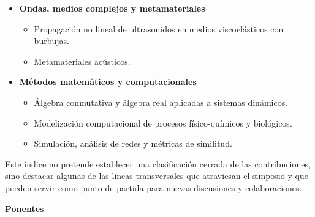 \documentclass[11pt,a4paper]{article}
\begin{document}
\begin{itemize}[leftmargin=*]
    \item \textbf{Ondas, medios complejos y metamateriales}
    \begin{itemize}
        \item Propagación no lineal de ultrasonidos en medios viscoelásticos con burbujas.
        \item Metamateriales acústicos.
    \end{itemize}

    \item \textbf{Métodos matemáticos y computacionales}
    \begin{itemize}
        \item Álgebra conmutativa y álgebra real aplicadas a sistemas dinámicos.
        \item Modelización computacional de procesos físico-químicos y biológicos.
        \item Simulación, análisis de redes y métricas de similitud.
    \end{itemize}

\end{itemize}

Este índice no pretende establecer una clasificación cerrada de las contribuciones, sino destacar algunas de las líneas transversales que atraviesan el simposio y que pueden servir como punto de partida para nuevas discusiones y colaboraciones.




\clearpage
{}
\label{sec:ponentes}

\begin{center}
{\LARGE\bfseries Ponentes}
\end{center}

\vspace{0.5cm}

\small
\end{document}
